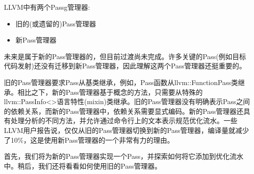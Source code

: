 LLVM中有两个Passg管理器: \par

\begin{itemize}
	\item 旧的(或遗留的)Pass管理器
	\item 新Pass管理器
\end{itemize}

未来是属于新的Pass管理器的，但目前过渡尚未完成。许多关键的Pass(例如目标代码发射)还没有迁移到新Pass管理器，因此理解这两个Pass管理器还挺重要的。\par

旧的Pass管理器要求Pass从基类继承，例如，Pass函数从llvm::FunctionPass类继承。相比之下，新的Pass管理器基于概念的方法，只需要从特殊的llvm::PassInfo<>语言特性(mixin)类继承。旧的Pass管理器没有明确表示Pass之间的依赖关系，而新的Pass管理器中，依赖关系需要显式编码。新的Pass管理器还具有处理分析的不同方法，并允许通过命令行上的文本表示规范优化流水。一些LLVM用户报告说，仅仅从旧的Pass管理器切换到新的Pass管理器，编译量就减少了10\%，这是使用新Pass管理器的一个非常有力的理由。\par

首先，我们将为新的Pass管理器实现一个Pass，并探索如何将它添加到优化流水中。稍后，我们还将看看如何使用旧的Pass管理器。\par

